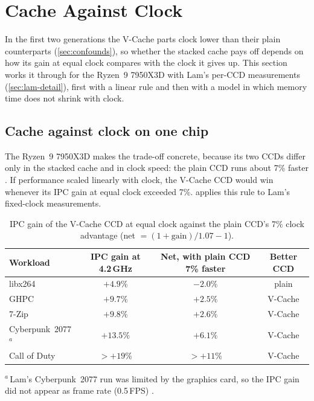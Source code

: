 \section{Cache Against Clock}
\label{sec:cache-against-clock}
In the first two generations the V-Cache parts clock lower than their plain counterparts (\cref{sec:confounds}), so whether the stacked cache pays off depends on how its gain at equal clock compares with the clock it gives up. This section works it through for the Ryzen~9 7950X3D with Lam's per-CCD measurements (\cref{sec:lam-detail}), first with a linear rule and then with a model in which memory time does not shrink with clock.

\subsection{Cache against clock on one chip}
\label{sec:cache-vs-clock}
The Ryzen~9 7950X3D makes the trade-off concrete, because its two CCDs differ only in the stacked cache and in clock speed: the plain CCD runs about 7\% faster \cite{lamAMDs7950X3DZen2023}. If performance scaled linearly with clock, the V-Cache CCD would win whenever its IPC gain at equal clock exceeded 7\%.  applies this rule to Lam's fixed-clock measurements.

\begin{table}[htbp]
  \centering
  \caption[IPC gain of the V-Cache CCD against the clock gap]{IPC gain of the V-Cache CCD at equal clock \cite{lamAMDs7950X3DZen2023} against the plain CCD's 7\% clock advantage (net $= (1 + \text{gain})/1.07 - 1$).}
  \label{tab:cache-vs-clock}
  \small
  \begin{tabular}{@{}lccc@{}}
    \toprule
    \textbf{Workload} & \textbf{IPC gain at 4.2\,GHz} & \textbf{Net, with plain CCD 7\% faster} & \textbf{Better CCD} \\
    \midrule
    libx264 & $+4.9\%$ & $-2.0\%$ & plain \\
    GHPC & $+9.7\%$ & $+2.5\%$ & V-Cache \\
    7-Zip & $+9.8\%$ & $+2.6\%$ & V-Cache \\
    Cyberpunk~2077$^{a}$ & $+13.5\%$ & $+6.1\%$ & V-Cache \\
    Call of Duty & $>+19\%$ & $>+11\%$ & V-Cache \\
    \bottomrule
  \end{tabular}
  \par\smallskip\footnotesize $^{a}$\,Lam's Cyberpunk~2077 run was limited by the graphics card, so the IPC gain did not appear as frame rate (0.5\,FPS) \cite{lamAMDs7950X3DZen2023}.
\end{table}


